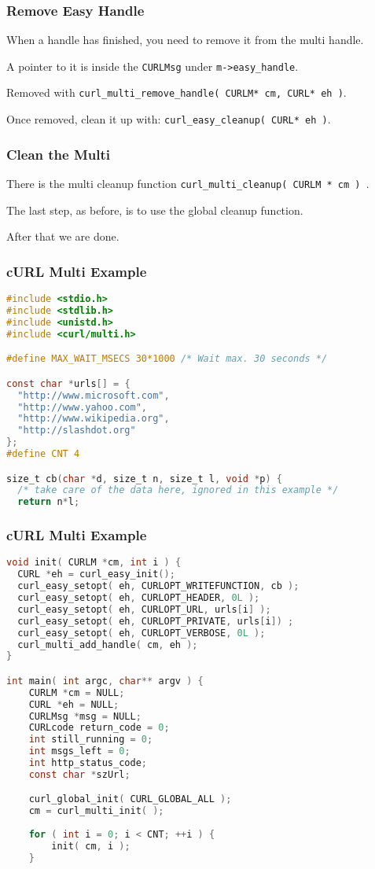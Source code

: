 \begin{frame}
	\frametitle{Remove Easy Handle}

	When a handle has finished, you need to remove it from the multi handle.

	A pointer to it is inside the \texttt{CURLMsg} under \texttt{m->easy\_handle}.

	Removed with \texttt{curl\_multi\_remove\_handle( CURLM* cm, CURL* eh )}.

	Once removed, clean it up with: \texttt{curl\_easy\_cleanup( CURL* eh )}.


\end{frame}

\begin{frame}
	\frametitle{Clean the Multi}

	There is the multi cleanup function \texttt{curl\_multi\_cleanup( CURLM * cm ) }.

	The last step, as before, is to use the global cleanup function.

	After that we are done.


\end{frame}

\begin{frame}[fragile]
	\frametitle{cURL Multi Example}

	\begin{lstlisting}[language=C]
#include <stdio.h>
#include <stdlib.h>
#include <unistd.h>
#include <curl/multi.h>

#define MAX_WAIT_MSECS 30*1000 /* Wait max. 30 seconds */

const char *urls[] = {
  "http://www.microsoft.com",
  "http://www.yahoo.com",
  "http://www.wikipedia.org",
  "http://slashdot.org"
};
#define CNT 4

size_t cb(char *d, size_t n, size_t l, void *p) {
  /* take care of the data here, ignored in this example */
  return n*l;
\end{lstlisting}

\end{frame}

\begin{frame}[fragile]
	\frametitle{cURL Multi Example}

	\begin{lstlisting}[language=C]
void init( CURLM *cm, int i ) {
  CURL *eh = curl_easy_init();
  curl_easy_setopt( eh, CURLOPT_WRITEFUNCTION, cb );
  curl_easy_setopt( eh, CURLOPT_HEADER, 0L );
  curl_easy_setopt( eh, CURLOPT_URL, urls[i] );
  curl_easy_setopt( eh, CURLOPT_PRIVATE, urls[i]) ;
  curl_easy_setopt( eh, CURLOPT_VERBOSE, 0L );
  curl_multi_add_handle( cm, eh );
}

int main( int argc, char** argv ) {
    CURLM *cm = NULL;
    CURL *eh = NULL;
    CURLMsg *msg = NULL;
    CURLcode return_code = 0;
    int still_running = 0; 
    int msgs_left = 0;
    int http_status_code;
    const char *szUrl;

    curl_global_init( CURL_GLOBAL_ALL );
    cm = curl_multi_init( );
    
    for ( int i = 0; i < CNT; ++i ) {
        init( cm, i );
    }
\end{lstlisting}

\end{frame}

